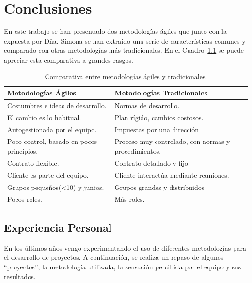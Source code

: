 \chapter{Conclusiones}
\label{ch:conclusiones}

En este trabajo se han presentado dos metodologías ágiles que junto
con la expuesta por Dña. Simona se han extraído una serie de
características comunes y comparado con otras metodologías más
tradicionales. En el Cuadro~\ref{tabla:comparativa} se puede apreciar esta
comparativa a grandes rasgos.\\



\begin{table}[]
\centering
\caption{Comparativa entre metodologías ágiles y tradicionales.}
\label{tabla:comparativa}
\begin{tabular}{|p{7cm}  | p{7cm} |}


\hline
\textbf{Metodologías Ágiles} & \textbf{Metodologías Tradicionales} \\
\hline
Costumbres e ideas de desarrollo. & Normas de desarrollo. \\
\hline
El cambio es lo habitual. & Plan rígido, cambios costosos. \\
\hline
Autogestionada por el equipo. & Impuestas por una dirección \\
\hline
Poco control, basado en pocos principios. & 
Proceso muy controlado, con normas y procedimientos. \\
\hline
Contrato flexible. & Contrato detallado y fijo. \\
\hline
Cliente es parte del equipo. & Cliente interactúa mediante
reuniones. \\
\hline
Grupos pequeños(<10) y juntos. & Grupos grandes y distribuidos. \\
\hline
Pocos roles. & Más roles. \\
\hline

\end{tabular}

\end{table}

\section{Experiencia Personal}
\label{sec:experiencia}

En los últimos años vengo experimentando el uso de diferentes
metodologías para el desarrollo de proyectos. A continuación, se
realiza un repaso de algunos ``proyectos'', la metodología utilizada,
la sensación percibida por el equipo y sus resultados. \\



